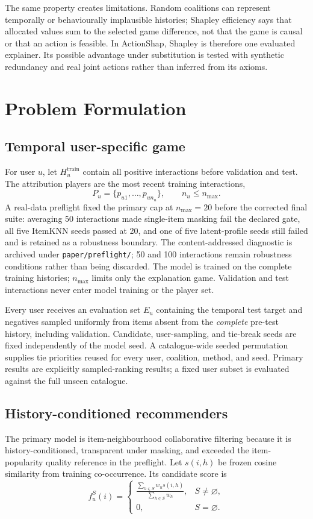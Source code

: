 \documentclass[pdflatex,sn-basic]{sn-jnl}
\begin{document}
The same property creates limitations. Random coalitions can represent temporally or behaviourally implausible histories; Shapley efficiency says that allocated values sum to the selected game difference, not that the game is causal or that an action is feasible. In ActionShap, Shapley is therefore one evaluated explainer. Its possible advantage under substitution is tested with synthetic redundancy and real joint actions rather than inferred from its axioms.

\section{Problem Formulation}
\subsection{Temporal user-specific game}
For user $u$, let $H_u^{\mathrm{train}}$ contain all positive interactions before validation and test. The attribution players are the most recent training interactions,
\begin{equation}
P_u=\{p_{u1},\ldots,p_{un_u}\}, \qquad n_u\le n_{\max}.
\end{equation}
A real-data preflight fixed the primary cap at $n_{\max}=20$ before the corrected final suite: averaging 50 interactions made single-item masking fail the declared gate, all five ItemKNN seeds passed at 20, and one of five latent-profile seeds still failed and is retained as a robustness boundary. The content-addressed diagnostic is archived under \texttt{paper/preflight/}; 50 and 100 interactions remain robustness conditions rather than being discarded.
The model is trained on the complete training histories; $n_{\max}$ limits only the explanation game. Validation and test interactions never enter model training or the player set.

Every user receives an evaluation set $E_u$ containing the temporal test target and negatives sampled uniformly from items absent from the \emph{complete} pre-test history, including validation. Candidate, user-sampling, and tie-break seeds are fixed independently of the model seed. A catalogue-wide seeded permutation supplies tie priorities reused for every user, coalition, method, and seed. Primary results are explicitly sampled-ranking results; a fixed user subset is evaluated against the full unseen catalogue.

\subsection{History-conditioned recommenders}
The primary model is item-neighbourhood collaborative filtering because it is history-conditioned, transparent under masking, and exceeded the item-popularity quality reference in the preflight. Let $s(i,h)$ be frozen cosine similarity from training co-occurrence. Its candidate score is
\begin{equation}
f_u^S(i)=
\begin{cases}
\displaystyle\frac{\sum_{h\in S}w_h s(i,h)}{\sum_{h\in S}w_h},&S\ne\varnothing,\\[6pt]
0,&S=\varnothing.
\end{cases}
\end{equation}
\end{document}
